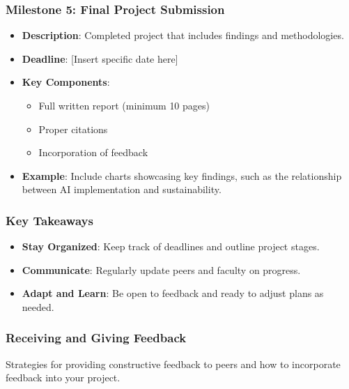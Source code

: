 \documentclass[aspectratio=169]{beamer}
\begin{document}
\begin{frame}[fragile]
    \frametitle{Milestone 5: Final Project Submission}
    \begin{itemize}
        \item \textbf{Description}: Completed project that includes findings and methodologies.
        \item \textbf{Deadline}: [Insert specific date here]
        \item \textbf{Key Components}:
        \begin{itemize}
            \item Full written report (minimum 10 pages)
            \item Proper citations
            \item Incorporation of feedback
        \end{itemize}
        \item \textbf{Example}: Include charts showcasing key findings, such as the relationship between AI implementation and sustainability.
    \end{itemize}
\end{frame}

\begin{frame}[fragile]
    \frametitle{Key Takeaways}
    \begin{itemize}
        \item \textbf{Stay Organized}: Keep track of deadlines and outline project stages.
        \item \textbf{Communicate}: Regularly update peers and faculty on progress.
        \item \textbf{Adapt and Learn}: Be open to feedback and ready to adjust plans as needed.
    \end{itemize}
\end{frame}

\begin{frame}[fragile]
    \frametitle{Receiving and Giving Feedback}
    Strategies for providing constructive feedback to peers and how to incorporate feedback into your project.
\end{frame}
\end{document}
